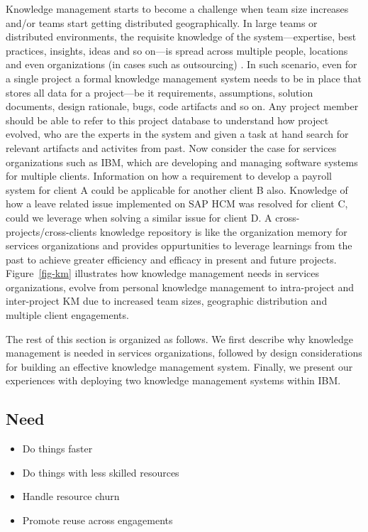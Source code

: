 Knowledge management starts to become a challenge when team size increases and/or teams start getting distributed geographically. In large teams or distributed environments, the requisite knowledge of the system---expertise, best practices, insights, ideas and so on---is spread across multiple people, locations and even organizations (in cases such as outsourcing) \cite{Desouza:2006}. In such scenario, even for a single project a formal knowledge management system needs to be in place that stores all data for a project---be it requirements, assumptions, solution documents, design rationale, bugs, code artifacts and so on. Any project member should be able to refer to this project database to understand how project evolved, who are the experts in the system and given a task at hand search for relevant artifacts and activites from past. Now consider the case for services organizations such as IBM, which are developing and managing software systems for multiple clients. Information on how a requirement to develop a payroll system for client A could be applicable for another client B also. Knowledge of how a leave related issue implemented on SAP HCM was resolved for client C, could we leverage when solving a similar issue for client D. 
A cross-projects/cross-clients knowledge repository is like the organization memory \cite{Stein:1995} for services organizations and provides oppurtunities to leverage learnings from the past to achieve greater efficiency and efficacy in present and future projects. Figure~\ref{fig-km} illustrates how knowledge management needs in services organizations, evolve from personal knowledge management to intra-project and inter-project KM due to increased team sizes, geographic distribution and multiple client engagements. 

The rest of this section is organized as follows. We first describe why knowledge management is needed in services organizations, followed by design considerations for building an effective knowledge management system. Finally, we present our experiences with deploying two knowledge management systems within IBM.

\subsection{Need}

\begin{itemize}
\item Do things faster
\item Do things with less skilled resources
\item Handle resource churn
\item Promote reuse across engagements
\end{itemize}

